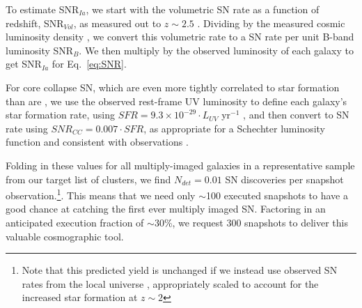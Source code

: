 To estimate SNR$_{Ia}$, we start with the volumetric SN rate as a
function of redshift, SNR$_{Vol}$, as measured out to $z\sim2.5$
\citep{Graur:2014,Rodney:2014}.  Dividing by the measured
cosmic luminosity density \citep{Reddy:2009}, we convert this volumetric
rate to a SN rate per unit B-band luminosity SNR$_{B}$.  We then multiply by
the observed luminosity of each galaxy to get SNR$_{Ia}$ for
Eq.~\ref{eq:SNR}.

For core collapse SN, which are even more tightly correlated to star
formation than are \SNIa, we use the observed rest-frame UV luminosity
to define each galaxy's star formation rate, using 
$SFR = 9.3\times 10^{-29} \cdot L_{UV}$ \Msun yr$^{-1}$ \citep{Dahlen:2007}, and
then convert to SN rate using $SNR_{CC} = 0.007 \cdot SFR$, as appropriate
for a Schechter luminosity function and consistent with
observations \citep{Dahlen:2012}.  

Folding in these values for all multiply-imaged galaxies in a
representative sample from our target list of clusters, we find
$N_{det}=0.01$ SN discoveries per snapshot observation.\footnote{Note
that this predicted yield is unchanged if we instead use observed SN
rates from the local universe \citep[e.g.][]{Mannucci:2005,Li:2011b},
appropriately scaled to account for the increased star formation at
$z\sim2$}. This means that we need only $\sim$100 executed snapshots
to have a good chance at catching the first ever multiply imaged
SN. Factoring in an anticipated execution fraction of $\sim$30\%, we
request 300 snapshots to deliver this valuable cosmographic tool.






